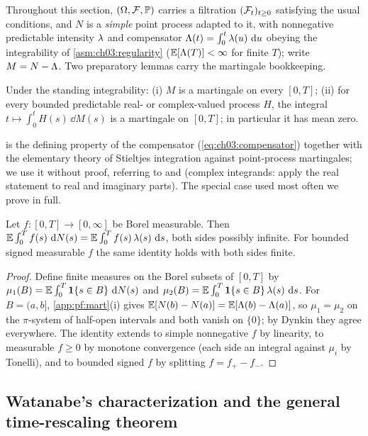 Throughout this section, $(\Omega, \mathcal{F}, \mathbb{P})$ carries a filtration $(\mathcal{F}_{t})_{t \ge 0}$ satisfying the
usual conditions, and $N$ is a \emph{simple} point process adapted to it, with nonnegative predictable
intensity $\lambda$ and compensator $\Lambda(t) = \int_0^t \lambda(u)\,\,\mathrm{d} u$ obeying the integrability of
\cref{asm:ch03:regularity} ($\mathbb{E}[\Lambda(T)] < \infty$ for finite $T$); write $M = N - \Lambda$. Two
preparatory lemmas carry the martingale bookkeeping.
\begin{lemma}
\label{app:pf:mart}
Under the standing integrability: (i) $M$ is a martingale on every $[0,T]$; (ii) for every bounded
predictable real- or complex-valued process $H$, the integral $t \mapsto \int_0^{t} H(s)\,\dd M(s)$ is
a martingale on $[0,T]$; in particular it has mean zero.
\end{lemma}

 is the defining property of the compensator (\cref{eq:ch03:compensator}) together
with the elementary theory of Stieltjes integration against point-process martingales; we use it
without proof, referring to \citet{bremaud1996} and \citet[Ch.~7]{daley2003} (complex integrands: apply
the real statement to real and imaginary parts). The special case used most often we prove in full.
\begin{lemma}
\label{app:pf:fubini}
Let $f : [0,T] \to [0,\infty]$ be Borel measurable. Then $\mathbb{E} \int_0^T f(s)\, \,\mathrm{d} N(s) = \mathbb{E} \int_0^T
f(s)\, \lambda(s)\, \,\mathrm{d} s$, both sides possibly infinite. For bounded signed measurable $f$ the same
identity holds with both sides finite.
\end{lemma}
\begin{proof}
Define finite measures on the Borel subsets of $[0,T]$ by $\mu_1(B) = \mathbb{E} \int_0^T \mathbf{1}\{s \in B\}\, \,\mathrm{d}
N(s)$ and $\mu_2(B) = \mathbb{E} \int_0^T \mathbf{1}\{s \in B\}\, \lambda(s)\, \,\mathrm{d} s$. For $B = (a,b]$,
\cref{app:pf:mart}(i) gives $\mathbb{E}[N(b) - N(a)] = \mathbb{E}[\Lambda(b) - \Lambda(a)]$, so $\mu_1 = \mu_2$ on the
$\pi$-system of half-open intervals and both vanish on $\{0\}$; by Dynkin they agree everywhere. The
identity extends to simple nonnegative $f$ by linearity, to measurable $f \ge 0$ by monotone
convergence (each side an integral against $\mu_i$ by Tonelli), and to bounded signed $f$ by splitting
$f = f_+ - f_-$.
\end{proof}
\subsection{Watanabe's characterization and the general time-rescaling theorem}

